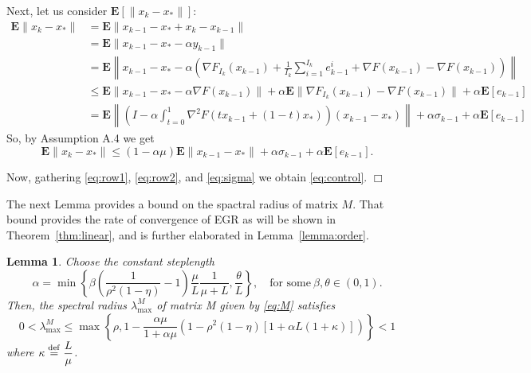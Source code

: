 \documentclass[11pt]{article}
\newtheorem{lem}[thm]{Lemma}
\newcommand{\defeq}{\stackrel{\rm def}{=}}
\newcommand{\E}{\mathbf{E}}
\begin{document}
\bigskip\noindent
Next, let us consider $\E[\|x_k-x_\ast\|]$:
 \begin{align*}
   \E\|x_k-x_\ast\| &= \E\|x_{k-1}-x_\ast + x_k-x_{k-1}\|\\
   &= \E\|x_{k-1}-x_\ast -\alpha y_{k-1}\|\\
   &= \E\left\|x_{k-1}-x_\ast -\alpha \left(\nabla F_{I_k}(x_{k-1}) + \frac{1}{I_k}\sum_{i=1}^{I_k} e_{k-1}^i + \nabla F(x_{k-1})-\nabla F(x_{k-1})\right)\right\|\\
   &\leq \E\|x_{k-1}-x_\ast -\alpha\nabla F(x_{k-1})\| + \alpha\E\|\nabla F_{I_k}(x_{k-1}) -\nabla F(x_{k-1})\| + \alpha \E[e_{k-1}]\\
   &=\E\left\|\left(I-\alpha\int_{t=0}^1 \nabla^2 F(tx_{k-1}+(1-t)x_\ast)\right)(x_{k-1}-x_\ast)\right\| + \alpha\sigma_{k-1} + \alpha \E[e_{k-1}]   
 \end{align*}
 So, by Assumption A.4 we get
\begin{equation}\label{eq:row2}
 \E\|x_k-x_\ast\| \leq (1-\alpha\mu)\E\|x_{k-1}-x_\ast\|+ \alpha\sigma_{k-1} + \alpha \E[e_{k-1}].
\end{equation}

\bigskip\noindent
Now, gathering \eqref{eq:row1}, \eqref{eq:row2}, and \eqref{eq:sigma} we obtain \eqref{eq:control}. 
\hspace*{\fill}$\Box$\medskip

\bigskip

The next Lemma provides a bound on the spactral radius of matrix $M$.  That bound provides the rate of convergence of EGR as will be shown in Theorem~\ref{thm:linear}, and is further elaborated in Lemma~\ref{lemma:order}.

\begin{lem} \label{lemma:spectral}
 Choose the constant steplength
 \begin{equation}\label{eq:alpha}
    \alpha = \min\left\lbrace\beta\left(\frac{1}{\rho^2(1-\eta)}-1\right)\frac{\mu}{L}\frac{1}{\mu+L},\frac{\theta}{L}\right\rbrace, \quad \mbox{for some} \ \beta,\theta\in(0,1).
 \end{equation}
 Then, the spectral radius $\lambda^M_{\max}$ of matrix M given by \eqref{eq:M} satisfies
 \begin{equation}\label{eq:spectral}
  0<\lambda^M_{\max} \leq \max\left\lbrace\rho, 1-\frac{\alpha\mu}{1+\alpha\mu}\left(1-\rho^2(1-\eta)[1+\alpha L(1+\kappa)]\right)\right\rbrace<1 
 \end{equation}
where $\kappa \defeq \displaystyle\frac{L}{\mu}$.
\end{lem}
\end{document}
